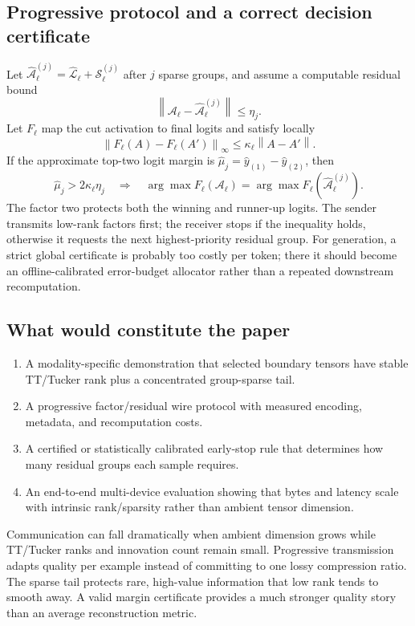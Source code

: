 \documentclass[10pt]{article}
\newcommand{\norm}[1]{\left\lVert #1\right\rVert}
\begin{document}
\subsection{Progressive protocol and a correct decision certificate}

Let $\widehat{\mathcal A}^{(j)}_\ell=\widehat{\mathcal L}_\ell+
\mathcal S_\ell^{(j)}$ after $j$ sparse groups, and assume a computable residual bound
\[
\norm{\mathcal A_\ell-\widehat{\mathcal A}^{(j)}_\ell}\le\eta_j .
\]
Let $F_\ell$ map the cut activation to final logits and satisfy locally
\[
\norm{F_\ell(A)-F_\ell(A')}_\infty\le
\kappa_\ell\norm{A-A'}.
\]
If the approximate top-two logit margin is
$\widehat\mu_j=\widehat y_{(1)}-\widehat y_{(2)}$, then
\[
\widehat\mu_j>2\kappa_\ell\eta_j
\quad\Longrightarrow\quad
\arg\max F_\ell(\mathcal A_\ell)
=\arg\max F_\ell(\widehat{\mathcal A}^{(j)}_\ell).
\]
The factor two protects both the winning and runner-up logits. The sender transmits low-rank
factors first; the receiver stops if the inequality holds, otherwise it requests the next
highest-priority residual group. For generation, a strict global certificate is probably too
costly per token; there it should become an offline-calibrated error-budget allocator rather than
a repeated downstream recomputation.

\subsection{What would constitute the paper}

\begin{enumerate}[leftmargin=1.55em,itemsep=3pt]
\item A modality-specific demonstration that selected boundary tensors have stable TT/Tucker
rank plus a concentrated group-sparse tail.
\item A progressive factor/residual wire protocol with measured encoding, metadata, and
recomputation costs.
\item A certified or statistically calibrated early-stop rule that determines how many residual
groups each sample requires.
\item An end-to-end multi-device evaluation showing that bytes and latency scale with intrinsic
rank/sparsity rather than ambient tensor dimension.
\end{enumerate}

\begin{donebox}[title={Expected advantages}]
Communication can fall dramatically when ambient dimension grows while TT/Tucker ranks and
innovation count remain small. Progressive transmission adapts quality per example instead of
committing to one lossy compression ratio. The sparse tail protects rare, high-value information
that low rank tends to smooth away. A valid margin certificate provides a much stronger quality
story than an average reconstruction metric.
\end{donebox}
\end{document}
